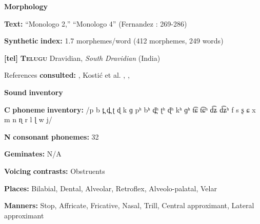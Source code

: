 \begin{styleBody}
\textbf{Morphology}
\end{styleBody}

\begin{styleBody}
\textbf{Text:} “Monologo 2,” “Monologo 4” (Fernandez \citealt{GarayHernandez2006}: 269-286)
\end{styleBody}

\begin{styleBody}
\textbf{Synthetic} \textbf{index:} 1.7 morphemes/word (412 morphemes, 249 words)
\end{styleBody}

\begin{styleBody}
\textbf{[tel]}   \textbf{\textsc{Telugu}}    Dravidian, \textit{South} \textit{Dravidian} (India)
\end{styleBody}

\begin{styleBody}
References \textbf{consulted:} \citet{Kelley1963}, Kostić et al. , \citet{Krishnamurti1998}, \citet{BhaskararaoRay2017}
\end{styleBody}

\begin{styleBody}
\textbf{Sound} \textbf{inventory}
\end{styleBody}

\begin{styleBody}
\textbf{C} \textbf{phoneme} \textbf{inventory:} /p b t̪ d̪ ʈ ɖ k ɡ pʰ bʰ d̪ʰ ʈʰ ɖʰ kʰ ɡʰ t͡ɕ t͡ɕʰ d͡ʑ d͡ʑʰ f s ʂ ɕ x m n ɳ r l ɭ w j/
\end{styleBody}

\begin{styleBody}
\textbf{N} \textbf{consonant} \textbf{phonemes:} 32
\end{styleBody}

\begin{styleBody}
\textbf{Geminates:} N/A
\end{styleBody}

\begin{styleBody}
\textbf{Voicing} \textbf{contrasts:} Obstruents
\end{styleBody}

\begin{styleBody}
\textbf{Places:} Bilabial, Dental, Alveolar, Retroflex, Alveolo-palatal, Velar
\end{styleBody}

\begin{styleBody}
\textbf{Manners:} Stop, Affricate, Fricative, Nasal, Trill, Central approximant, Lateral approximant
\end{styleBody}

